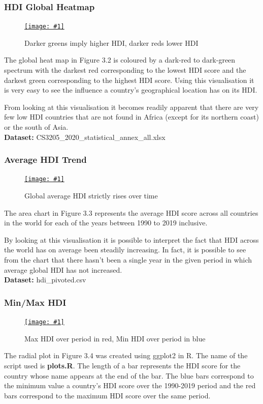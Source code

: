 \documentclass[11pt,a4paper,final]{article}
\newcommand\onlinefig[3]{
\begin{figure}[H]
  \centering
  \href{#3}{\texttt{[image: \#1]}}
  \caption{#2} 
  \label{fig:#1}
\end{figure}
}
\begin{document}
\begin{multicols}{2}
\subsubsection{HDI Global Heatmap}
\onlinefig{hdi_global_heatmap}{Darker greens imply higher HDI, darker reds lower HDI}{https://public.tableau.com/views/CS3205-HDI/Sheet3?:language=en-GB&:display_count=n&:origin=viz_share_link}

The global heat map in Figure 3.2 is coloured by a dark-red to dark-green spectrum with the darkest red corresponding to the lowest HDI score and the darkest green corresponding to the highest HDI score. Using this visualisation it is very easy to see the influence a country's geographical location has on its HDI.

From looking at this visualisation it becomes readily apparent that there are very few low HDI countries that are not found in Africa (except for its northern coast) or the south of Asia.
\\
\textbf{Dataset:} CS3205\_2020\_statistical\_annex\_all.xlsx

\subsubsection{Average HDI Trend}
\onlinefig{global_average_hdi_areachart}{Global average HDI strictly rises over time}{https://public.tableau.com/views/CS3205_hdi_csv/Sheet2?:language=en-GB&:display_count=n&:origin=viz_share_link}

The area chart in Figure 3.3 represents the average HDI score across all countries in the world for each of the years between 1990 to 2019 inclusive.

By looking at this visualisation it is possible to interpret the fact that HDI across the world has on average been steadily increasing. In fact, it is possible to see from the chart that there hasn't been a single year in the given period in which average global HDI has not increased.
\\
\textbf{Dataset:} hdi\_pivoted.csv

\subsubsection{Min/Max HDI}
\onlinefig{min_vs_max_hdi_radialplot}{Max HDI over period in red, Min HDI over period in blue}{https://user-images.githubusercontent.com/56483187/155840052-f17e03e9-c48b-4dfd-8096-2bd5f066dd91.png}

The radial plot in Figure 3.4 was created using ggplot2 in R. The name of the script used is \textbf{plots.R}. The length of a bar represents the HDI score for the country whose name appears at the end of the bar. The blue bars correspond to the minimum value a country's HDI score over the 1990-2019 period and the red bars correspond to the maximum HDI score over the same period.


\end{multicols}
\end{document}
